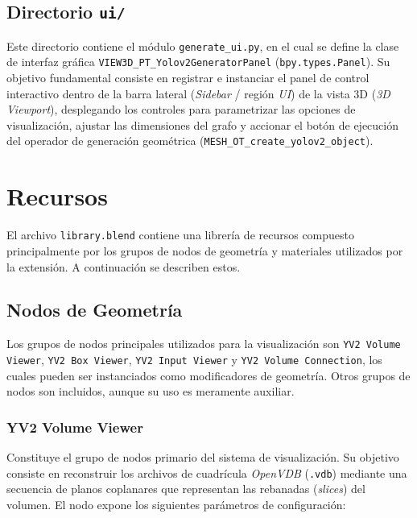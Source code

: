 \subsection{Directorio \texttt{ui/}}
Este directorio contiene el módulo \texttt{generate\_ui.py}, en el cual se define la clase de interfaz gráfica \texttt{VIEW3D\_PT\_Yolov2GeneratorPanel} 
(\texttt{bpy.types.Panel}). Su objetivo fundamental consiste en registrar e instanciar el panel de control interactivo dentro de la barra lateral 
(\textit{Sidebar} / región \textit{UI}) de la vista 3D (\textit{3D Viewport}), desplegando los controles para parametrizar las opciones de visualización, 
ajustar las dimensiones del grafo y accionar el botón de ejecución del operador de generación geométrica (\texttt{MESH\_OT\_create\_yolov2\_object}).

\section{Recursos}
El archivo \texttt{library.blend} contiene una librería de recursos compuesto principalmente por los grupos de nodos de geometría y materiales utilizados
por la extensión. A continuación se describen estos.

\subsection{Nodos de Geometría}
Los grupos de nodos principales utilizados para la visualización son \texttt{YV2 Volume Viewer}, \texttt{YV2 Box Viewer}, \texttt{YV2 Input Viewer}
y \texttt{YV2 Volume Connection}, los cuales pueden ser instanciados como modificadores de geometría. Otros grupos de nodos son incluidos, aunque
su uso es meramente auxiliar.

\subsubsection{YV2 Volume Viewer}
Constituye el grupo de nodos primario del sistema de visualización. Su objetivo consiste en reconstruir los archivos de cuadrícula \textit{OpenVDB} (\texttt{.vdb}) 
mediante una secuencia de planos coplanares que representan las rebanadas (\textit{slices}) del volumen. El nodo expone los siguientes parámetros de configuración:

